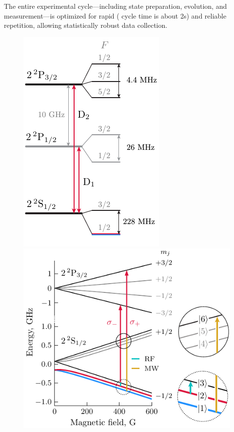 The entire experimental cycle—including state preparation, evolution, and measurement—is optimized for rapid ( cycle time is about 2s) and reliable repetition, allowing statistically robust data collection. 



\begin{figure}
    \centering
    \includegraphics{fig-ai/li-levels-base.pdf}
    \hspace{1cm}
    \includegraphics{fig-ai/li6-zeeman-broken-ai.pdf}

\end{figure}
